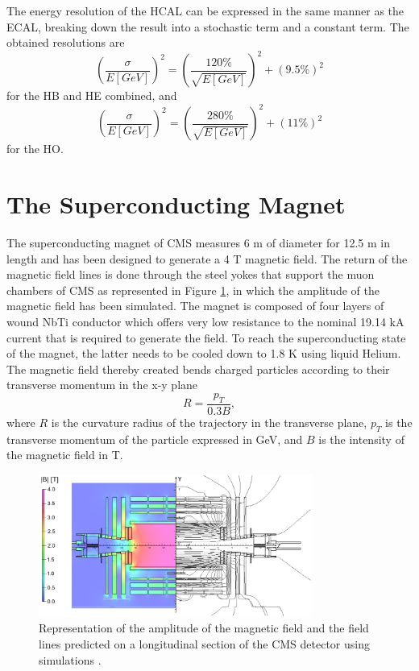     The energy resolution of the HCAL can be expressed in the same manner as the ECAL, breaking down the result into a stochastic term and a constant term. The obtained resolutions \cite{Baiatian:1049929} are
    \begin{equation}
      \left( \frac{\sigma}{E[GeV]} \right)^2 = \left( \frac{120\%}{\sqrt{E[GeV]}} \right)^2 + (9.5\%)^2
    \end{equation}
    for the HB and HE combined, and
    \begin{equation}
      \left( \frac{\sigma}{E[GeV]} \right)^2 = \left( \frac{280\%}{\sqrt{E[GeV]}} \right)^2 + (11\%)^2
    \end{equation}
    for the HO.

  \section{The Superconducting Magnet}

    The superconducting magnet of CMS measures 6 m of diameter for 12.5 m in length and has been designed to generate a 4 T magnetic field. The return of the magnetic field lines is done through the steel yokes that support the muon chambers of CMS as represented in Figure \ref{fig:I-3-cms-magnet}, in which the amplitude of the magnetic field has been simulated. The magnet is composed of four layers of wound NbTi conductor which offers very low resistance to the nominal 19.14 kA current that is required to generate the field. To reach the superconducting state of the magnet, the latter needs to be cooled down to 1.8 K using liquid Helium. The magnetic field thereby created bends charged particles according to their transverse momentum in the x-y plane
    \begin{equation}
      R = \frac{p_T}{0.3 B} ,
    \end{equation}
    where $ R $ is the curvature radius of the trajectory in the transverse plane, $ p_T $ is the transverse momentum of the particle expressed in GeV, and $ B $ is the intensity of the magnetic field in T.

    \begin{figure}[b!]
      \centering
      \includegraphics[width=0.8\textwidth]{img/I-3-cms/magnet.png}
      \caption{Representation of the amplitude of the magnetic field and the field lines predicted on a longitudinal section of the CMS detector using simulations \cite{Chatrchyan:2009si}.}
      \label{fig:I-3-cms-magnet}
    \end{figure}

